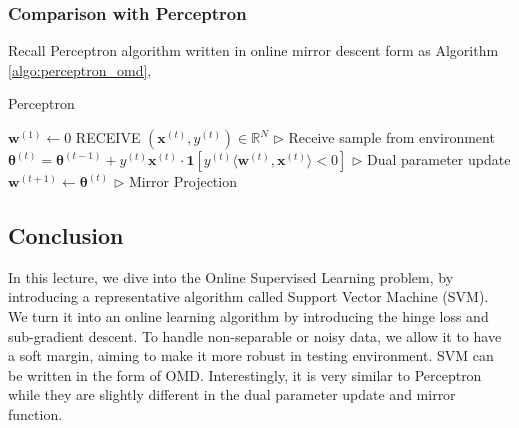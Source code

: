 \documentclass[11pt]{article}
\begin{document}
\subsubsection{Comparison with Perceptron}
Recall Perceptron algorithm written in online mirror descent form as Algorithm \ref{algo:perceptron_omd},
\begin{algorithm}[H]
\caption{Perceptron}
\label{algo:perceptron_omd}
\begin{algorithmic}[1]
\STATE $\boldsymbol{w}^{(1)} \leftarrow 0$ 
\STATE RECEIVE $(\boldsymbol{x}^{(t)}, y^{(t)}) \in \mathbb{R}^N$ \hfill $\triangleright$ Receive sample from environment
\STATE $\boldsymbol{\theta}^{(t)} = \boldsymbol{\theta}^{(t-1)} + y^{(t)}\boldsymbol{x}^{(t)}\cdot\textbf{1}[y^{(t)}\langle \boldsymbol{w}^{(t)}, \boldsymbol{x}^{(t)} \rangle  < 0]$ \hfill $\triangleright$ Dual parameter update
\STATE $\boldsymbol{w}^{(t+1)} \leftarrow \boldsymbol{\theta}^{(t)}$ \hfill $\triangleright$ Mirror Projection
\ENDFOR
\end{algorithmic}
\end{algorithm}


\normalfont
\subsection{Conclusion}
In this lecture, we dive into the Online Supervised Learning problem, by introducing a representative algorithm called Support Vector Machine (SVM). We turn it into an online learning algorithm by introducing the hinge loss and sub-gradient descent. To handle non-separable or noisy data, we allow it to have a soft margin, aiming to make it more robust in testing environment. SVM can be written in the form of OMD. Interestingly, it is very similar to Perceptron while they are slightly different in the dual parameter update and mirror function.
\newpage
\end{document}
